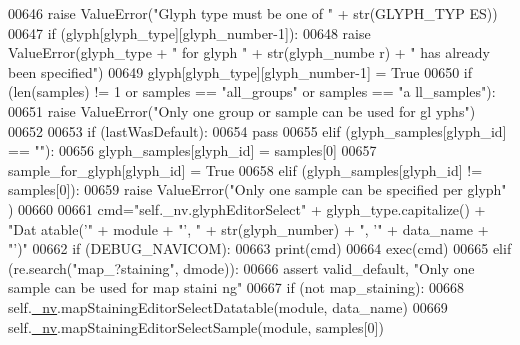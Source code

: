 \begin{DoxyCode}
00646                     \textcolor{keywordflow}{raise} ValueError(\textcolor{stringliteral}{"Glyph type must be one of "} + str(GLYPH\_TYP
      ES))
00647                 \textcolor{keywordflow}{if} (glyph[glyph\_type][glyph\_number-1]):
00648                     \textcolor{keywordflow}{raise} ValueError(glyph\_type + \textcolor{stringliteral}{" for glyph "} + str(glyph\_numbe
      r) + \textcolor{stringliteral}{" has already been specified"})
00649                 glyph[glyph\_type][glyph\_number-1] = \textcolor{keyword}{True}
00650                 \textcolor{keywordflow}{if} (len(samples) != 1 \textcolor{keywordflow}{or} samples == \textcolor{stringliteral}{"all\_groups"} \textcolor{keywordflow}{or} samples == \textcolor{stringliteral}{"a
      ll\_samples"}):
00651                     \textcolor{keywordflow}{raise} ValueError(\textcolor{stringliteral}{"Only one group or sample can be used for gl
      yphs"})
00652 
00653                 \textcolor{keywordflow}{if} (lastWasDefault):
00654                     \textcolor{keywordflow}{pass}
00655                 \textcolor{keywordflow}{elif} (glyph\_samples[glyph\_id] == \textcolor{stringliteral}{""}):
00656                     glyph\_samples[glyph\_id] = samples[0]
00657                     sample\_for\_glyph[glyph\_id] = \textcolor{keyword}{True}
00658                 \textcolor{keywordflow}{elif} (glyph\_samples[glyph\_id] != samples[0]):
00659                     \textcolor{keywordflow}{raise} ValueError(\textcolor{stringliteral}{"Only one sample can be specified per glyph"
      })
00660 
00661                 cmd=\textcolor{stringliteral}{"self.\_nv.glyphEditorSelect"} + glyph\_type.capitalize() + \textcolor{stringliteral}{"Dat
      atable('"} + module +  \textcolor{stringliteral}{"', "} + str(glyph\_number) + \textcolor{stringliteral}{", '"} + data\_name + \textcolor{stringliteral}{"')"}
00662                 \textcolor{keywordflow}{if} (DEBUG\_NAVICOM):
00663                     \textcolor{keywordflow}{print}(cmd)
00664                 exec(cmd)
00665             \textcolor{keywordflow}{elif} (re.search(\textcolor{stringliteral}{"map\_?staining"}, dmode)):
00666                 \textcolor{keyword}{assert} valid\_default, \textcolor{stringliteral}{"Only one sample can be used for map staini
      ng"}
00667                 \textcolor{keywordflow}{if} (\textcolor{keywordflow}{not} map\_staining):
00668                     self.\hyperlink{classnavicom_1_1navicom_1_1NaviCom_afff3fd56fa16a68bab52ba8d801e325a}{_nv}.mapStainingEditorSelectDatatable(module, data\_name)
00669                     self.\hyperlink{classnavicom_1_1navicom_1_1NaviCom_afff3fd56fa16a68bab52ba8d801e325a}{_nv}.mapStainingEditorSelectSample(module, samples[0])

\end{DoxyCode}
